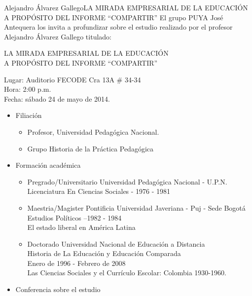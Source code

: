 \documentclass[10pt]{beamer}
\begin{document}
\begin{frame}{Alejandro Álvarez Gallego}{LA MIRADA EMPRESARIAL DE LA EDUCACIÓN\\
A PROPÓSITO DEL INFORME “COMPARTIR”}
El grupo PUYA José Antequera los invita a profundizar sobre el estudio realizado por el profesor Alejandro Álvarez Gallego titulado:
\vspace*{10pt}
\begin{center}
\Large LA MIRADA EMPRESARIAL DE LA EDUCACIÓN\\
A PROPÓSITO DEL INFORME “COMPARTIR”
\end{center}
\vspace*{10pt}
Lugar: Auditorio FECODE Cra 13A \# 34-34\\
Hora: 2:00 p.m.\\
Fecha: sábado 24 de mayo de 2014.
\vspace*{5pt}
  \begin{itemize}
  \item 
    Filiación
    \begin{itemize}
    \item
      Profesor, Universidad Pedagógica Nacional.
    \item
      Grupo Historia de la Práctica Pedagógica
    \end{itemize}

    \item Formación académica
    \begin{itemize}
    \item
      Pregrado/Universitario Universidad Pedagógica Nacional - U.P.N.\\
Licenciatura En Ciencias Sociales - 1976 - 1981
    \item
	Maestria/Magister Pontificia Universidad Javeriana - Puj - Sede Bogotá\\
Estudios Políticos --1982 - 1984\\
El estado liberal en América Latina
    \item
      Doctorado Universidad Nacional de Educación a Distancia\\
Historia de La Educación y Educación Comparada\\
Enero de 1996 - Febrero de 2008\\
Las Ciencias Sociales y el Currículo Escolar: Colombia 1930-1960.\\
    \end{itemize}
  \item
    Conferencia sobre el estudio

  \end{itemize}
\end{frame}
\end{document}
